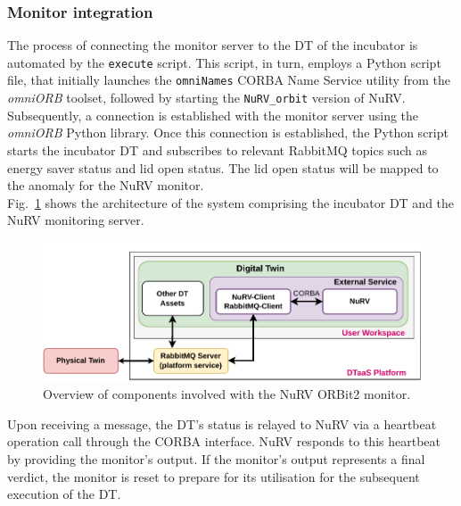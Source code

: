 \subsubsection{Monitor integration}
The process of connecting the monitor server to the DT of the incubator is automated by the \texttt{execute} script. This script, in turn, employs a Python script file, that initially launches the \texttt{omniNames} CORBA Name Service utility from the \textit{omniORB} toolset, followed by starting the \texttt{NuRV\_orbit} version of NuRV. Subsequently, a connection is established with the monitor server using the \textit{omniORB} Python library. Once this connection is established, the Python script starts the incubator DT and subscribes to relevant RabbitMQ topics such as energy saver status and lid open status. The lid open status will be mapped to the anomaly for the NuRV monitor.\\
Fig.~\ref{fig:nurv-orbit-architecture-diagram} shows the architecture of the system comprising the incubator DT and the NuRV monitoring server.%
%
\begin{figure}[ht]
	\centering
	\includegraphics[width=\linewidth]{images/NuRV-native-integration.pdf}
	\caption{Overview of components involved with the NuRV ORBit2 monitor.}
	\label{fig:nurv-orbit-architecture-diagram}
\end{figure}
%
Upon receiving a message, the DT's status is relayed to NuRV via a heartbeat operation call through the CORBA interface. NuRV responds to this heartbeat by providing the monitor's output. If the monitor's output represents a final verdict, the monitor is reset to prepare for its utilisation for the subsequent execution of the DT.
